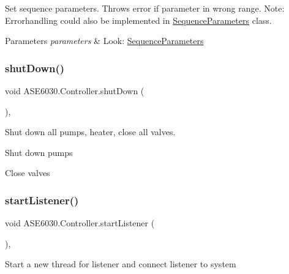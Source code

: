Set sequence parameters. Throws error if parameter in wrong range. Note\+: Errorhandling could also be implemented in \hyperlink{class_a_s_e6030_1_1_sequence_parameters}{Sequence\+Parameters} class. 
\begin{DoxyParams}{Parameters}
{\em parameters} & Look\+: \hyperlink{class_a_s_e6030_1_1_sequence_parameters}{Sequence\+Parameters} \\
\hline
\end{DoxyParams}
\mbox{\label{class_a_s_e6030_1_1_controller_a9ce11137966555bf33690347e1e56cf7}} 
\subsubsection{\texorpdfstring{shut\+Down()}{shutDown()}}
{\footnotesize\ttfamily void A\+S\+E6030.\+Controller.\+shut\+Down (\begin{DoxyParamCaption}{ }\end{DoxyParamCaption})\hspace{0.3cm}{\ttfamily [inline]}, {\ttfamily [private]}}



Shut down all pumps, heater, close all valves. 

Shut down pumps

Close valves \mbox{\label{class_a_s_e6030_1_1_controller_ac13cb64488eb479527e08d4af8f29869}} 
\subsubsection{\texorpdfstring{start\+Listener()}{startListener()}}
{\footnotesize\ttfamily void A\+S\+E6030.\+Controller.\+start\+Listener (\begin{DoxyParamCaption}{ }\end{DoxyParamCaption})\hspace{0.3cm}{\ttfamily [inline]}, {\ttfamily [private]}}

Start a new thread for listener and connect listener to system \mbox{\label{class_a_s_e6030_1_1_controller_afca76c3628ed37f21c1aac044a5e0441}} 
